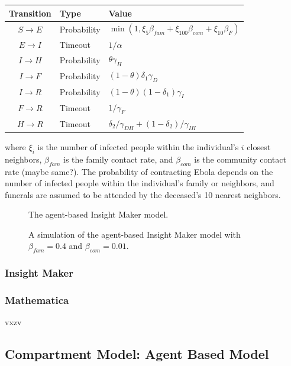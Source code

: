 \documentclass[10pt]{article}
\begin{document}
\begin{table}[ht]
\begin{center}
\begin{tabular}{c | l | l}
{\bf Transition} & {\bf Type } & {\bf Value}\\\hline
$S\rightarrow E$ & Probability & $\min(1,\xi_5\beta_{fam}+\xi_{100}\beta_{com}+\xi_{10}\beta_F)$\\
$E\rightarrow I$ & Timeout & $1/\alpha$\\
$I\rightarrow H$ & Probability & $\theta\gamma_H$\\
$I\rightarrow F$ & Probability & $(1-\theta)\delta_1\gamma_D$\\
$I\rightarrow R$ & Probability & $(1-\theta)(1-\delta_{1})\gamma_I$\\
$F\rightarrow R$ & Timeout & ${1}/{\gamma_{F}}$\\
$H\rightarrow R$ & Timeout & $\delta_{2}/{\gamma_{DH}} + (1-\delta_{2})/{\gamma_{IH}}$\\
\end{tabular}
\end{center}
\end{table}
\noindent where $\xi_{i}$ is the number of infected people within the individual's $i$ closest neighbors, $\beta_{fam}$ is the family contact rate, and $\beta_{com}$ is the community contact rate (maybe same?). The probability of contracting Ebola depends on the number of infected people within the individual's family or neighbors, and funerals are assumed to be attended by the deceased's 10 nearest neighbors.

\begin{figure}
\caption{The agent-based Insight Maker model.}
\end{figure}

\begin{figure}
\caption{A simulation of the agent-based Insight Maker model with $\beta_{fam}=0.4$ and $\beta_{com}=0.01$.}
\end{figure}

\subsubsection{Insight Maker}

\subsubsection{Mathematica}
vxzv

\subsection{Compartment Model: Agent Based Model}
\end{document}
